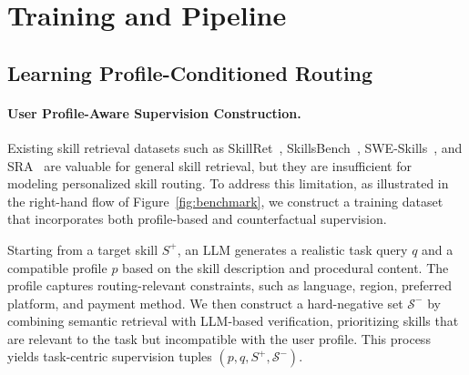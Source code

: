 \documentclass[letterpaper]{article} %
\begin{document}
\section{Training and Pipeline}
\subsection{Learning Profile-Conditioned Routing}

\paragraph{User Profile-Aware Supervision Construction.}

Existing skill retrieval datasets such as SkillRet~\cite{cho2026skillretlargescalebenchmarkskill}, SkillsBench~\cite{li2026skillsbenchbenchmarkingagentskills}, SWE-Skills~\cite{han2026sweskillsbenchagentskillsactually}, and SRA~\cite{su2026skillretrievalaugmentationagentic} are valuable for general skill retrieval, but they are insufficient for modeling personalized skill routing. To address this limitation, as illustrated in the right-hand flow of Figure~\ref{fig:benchmark}, we construct a training dataset that incorporates both profile-based and counterfactual supervision.

Starting from a target skill $S^{+}$, an LLM generates a realistic task query $q$ and a compatible profile $p$ based on the skill description and procedural content. The profile captures routing-relevant constraints, such as language, region, preferred platform, and payment method. We then construct a hard-negative set $\mathcal{S}^{-}$ by combining semantic retrieval with LLM-based verification, prioritizing skills that are relevant to the task but incompatible with the user profile. This process yields task-centric supervision tuples $(p,q,S^{+},\mathcal{S}^{-})$.
\end{document}
